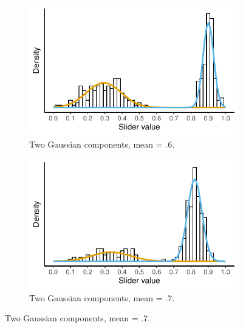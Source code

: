 \documentclass{language}
\newcommand{\6}{\mbox{$[\hspace*{-.6mm}[$}}
\newcommand{\9}{\mbox{$]\hspace*{-.6mm}]$}}
\begin{document}
\begin{figure}[h!]
\begin{subfigure}{.4\textwidth}
\includegraphics[width=\textwidth]{Language-figures/color/Figure18c}
\caption{Two Gaussian components, mean = .6.}
\label{fig:2comp}
\end{subfigure}
\begin{subfigure}{.4\textwidth}
\includegraphics[width=\textwidth]{Language-figures/color/Figure18d}
\caption{Two Gaussian components, mean = .7.}
\label{fig:2comp}
\end{subfigure}



\end{figure}
\end{document}
